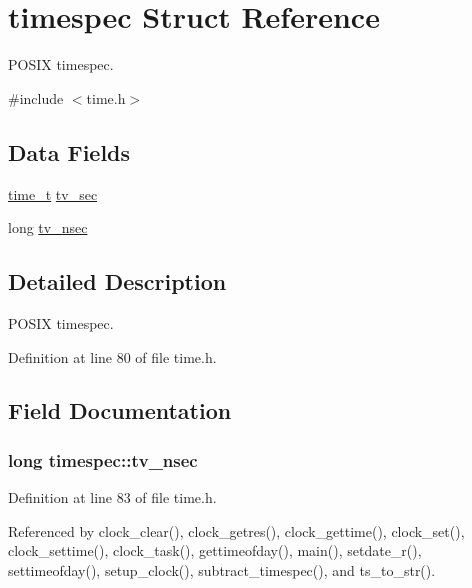 \hypertarget{structtimespec}{\section{timespec Struct Reference}
\label{structtimespec}
}


P\-O\-S\-I\-X timespec.  




{\ttfamily \#include $<$time.\-h$>$}

\subsection*{Data Fields}
\begin{DoxyCompactItemize}
\item 
\hyperlink{posix_8h_a3346b04b0420b32ccf6b706551b70762}{time\-\_\-t} \hyperlink{structtimespec_afc3302668d7cb5952f590da69fdd4955}{tv\-\_\-sec}
\item 
long \hyperlink{structtimespec_ae3c7510dafa8cbcaede866ed13c99683}{tv\-\_\-nsec}
\end{DoxyCompactItemize}


\subsection{Detailed Description}
P\-O\-S\-I\-X timespec. 

Definition at line 80 of file time.\-h.



\subsection{Field Documentation}
\hypertarget{structtimespec_ae3c7510dafa8cbcaede866ed13c99683}{
\subsubsection[{tv\-\_\-nsec}]{\setlength{\rightskip}{0pt plus 5cm}long timespec\-::tv\-\_\-nsec}}\label{structtimespec_ae3c7510dafa8cbcaede866ed13c99683}


Definition at line 83 of file time.\-h.



Referenced by clock\-\_\-clear(), clock\-\_\-getres(), clock\-\_\-gettime(), clock\-\_\-set(), clock\-\_\-settime(), clock\-\_\-task(), gettimeofday(), main(), setdate\-\_\-r(), settimeofday(), setup\-\_\-clock(), subtract\-\_\-timespec(), and ts\-\_\-to\-\_\-str().

